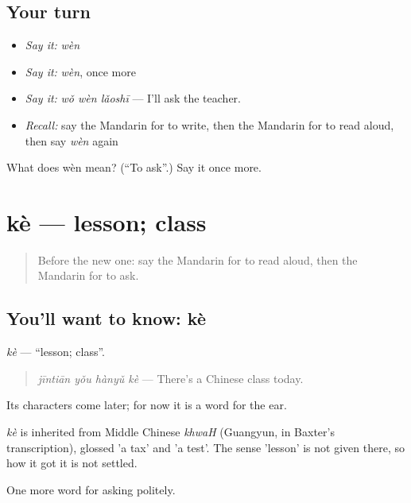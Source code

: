 \subsection*{Your turn}
\begin{itemize}
\raggedright
  \item \emph{Say it:} \emph{wèn}
  \item \emph{Say it:} \emph{wèn}, once more
  \item \emph{Say it:} \emph{wǒ wèn lǎoshī} — I'll ask the teacher.
  \item \emph{Recall:} say the Mandarin for to write, then the Mandarin for to read aloud, then say \emph{wèn} again
\end{itemize}

\begin{tcolorbox}[breakable,colback=teal!4,colframe=teal!35!black,title={Before you move on}]
What does wèn mean? (\textquotedblleft{}To ask\textquotedblright{}.) Say it once more.
\end{tcolorbox}
\section[kè]{kè — lesson; class}

\label{lesson:ZH-C54-ke}



\begin{quote}
Before the new one: say the Mandarin for to read aloud, then the Mandarin for to ask.
\end{quote}

\subsection*{You'll want to know: kè}
\emph{kè} — \textquotedblleft{}lesson; class\textquotedblright{}.

\begin{quote}
\emph{jīntiān yǒu hànyǔ kè} — There's a Chinese class today.
\end{quote}

Its characters come later; for now it is a word for the ear.

\begin{cousinweb}
\emph{kè} is inherited from Middle Chinese \emph{khwaH} (Guangyun, in Baxter's transcription), glossed 'a tax' and 'a test'. The sense 'lesson' is not given there, so how it got it is not settled.
\end{cousinweb}

\begin{grammarlens}[title={What you've built}]
One more word for asking politely.
\end{grammarlens}

